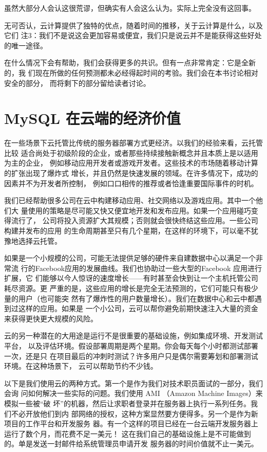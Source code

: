 虽然大部分人会认这很荒谬，但确实有人会这么认为。实际上完全没有这回事。

无可否认，云计算提供了独特的优点，随着时间的推移，关于云计算是什么，以及它们
注3：我们不是说这会更加容易或便宜，我们只是说云并不是能获得这些好处的唯一途径。

在什么情况下会有帮助，我们会获得更多的共识。但有一点非常肯定：它是全新的，我
们现在所做的任何预测都未必经得起时间的考验。我们会在本书讨论相对安全的部分，
而将剩下的部分留给读者讨论。

\section{MySQL 在云端的经济价值}
在一些场景下云托管比传统的服务器部署方式更经济。以我们的经验来看，云托管比较
适合尚处于初级阶段的企业，或者那些持续接触新概念并且本质上是以适用为主的企业，
例如移动应用开发者或游戏开发者。这些技术的市场随着移动计算的扩张出现了爆炸式
增长，并且仍然是快速发展的领域。在许多情况下，成功的因素并不为开发者所控制，
例如口口相传的推荐或者恰逢重要国际事件的时机。

我们已经帮助很多公司在云中构建移动应用、社交网络以及游戏应用。其中一个他们大
量使用的策略是尽可能又快又便宜地开发和发布应用。如果一个应用碰巧变得流行了，
公司将投入资源扩大其规模；否则就会很快终结这些应用。一些公司构建并发布的应用
的生命周期甚至只有几个星期，在这样的环境下，可以毫不犹豫地选择云托管。

如果是一个小规模的公司，可能无法提供足够的硬件来自建数据中心以满足一个非常流
行的Facebook应用的发展曲线。我们也协助过一些大型的Facebook 应用进行扩展，它
们能够以今人惊讶的速度增长——有时甚至会快到让一个主机托管公司耗尽资源。更
严重的是，这些应用的增长是完全无法预测的，它们可能只有极少量的用户（也可能突
然有了爆炸性的用户数量增长）。我们在数据中心和云中都遇到过这样的应用。如果是
一个小公司，云可以帮你避免前期快速注入大量的资金来获得更快更大规模的风险。

云的另一种潜在的大用途是运行不是很重要的基础设施，例如集成环境、开发测试平台，
以及评估环境。假设部署周期是两个星期。你会每天每个小时都测试部署一次，还是只
在项目最后的冲刺时测试？许多用户只是偶尔需要筹划和部署测试环境。在这种场景下，
云可以帮助节约不少钱。

以下是我们使用云的两种方式。第一个是作为我们对技术职员面试的一部分，我们会询
问如何解决一些实际的问题。我们使用 AMI （Amazon Machine Images）来模拟一些被“破
坏”的机器，然后让求职者登录并在服务器上执行一系列任务。我们不必开放他们到内
部网络的授权，这种方案显然要方便得多。另一个是作为新项目的工作平台和开发服务
器。有一个这样的项目已经在一台云端开发服务器上运行了数个月，而花费不足一美元！
这在我们自己的基础设施上是不可能做到的。单是发送一封邮件给系统管理员申请开发
服务器的时间价值就不止一美元。

